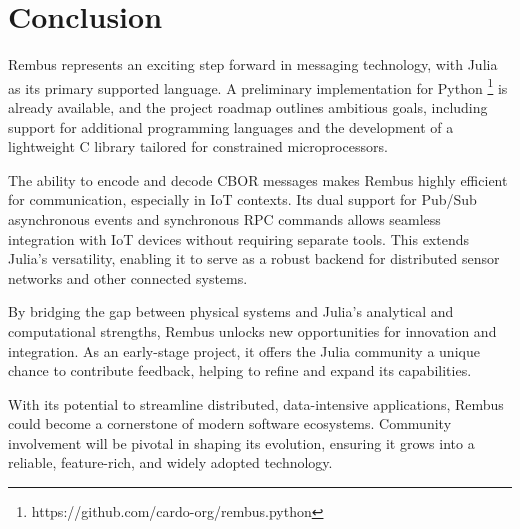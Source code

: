 \documentclass{juliacon}
\begin{document}
\section{Conclusion}\label{conclusion}

Rembus represents an exciting step forward in messaging technology, with Julia as its
primary supported language. A preliminary implementation for Python
\footnote{https://github.com/cardo-org/rembus.python} is already available,
and the project roadmap outlines ambitious goals, including support for additional
programming languages and the development of a lightweight C library tailored for
constrained microprocessors.
\vskip 6pt

The ability to encode and decode CBOR messages makes Rembus highly efficient for
communication, especially in IoT contexts. Its dual support for Pub/Sub asynchronous events
and synchronous RPC commands allows seamless integration with IoT devices without requiring
separate tools. This extends Julia's versatility, enabling it to serve as a robust backend
for distributed sensor networks and other connected systems.
\vskip 6pt

By bridging the gap between physical systems and Julia’s analytical and computational
strengths, Rembus unlocks new opportunities for innovation and integration. As an
early-stage project, it offers the Julia community a unique chance to contribute feedback,
helping to refine and expand its capabilities.
\vskip 6pt

With its potential to streamline distributed, data-intensive applications, Rembus could
become a cornerstone of modern software ecosystems. Community involvement will be pivotal in
shaping its evolution, ensuring it grows into a reliable, feature-rich, and widely adopted
technology.


\end{document}
